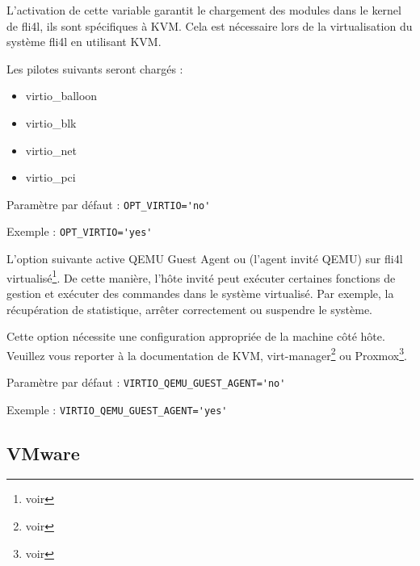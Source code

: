 \begin{description}

L'activation de cette variable garantit le chargement des modules dans
le kernel de fli4l, ils sont spécifiques à KVM. Cela est nécessaire
lors de la virtualisation du système fli4l en utilisant KVM.

Les pilotes suivants seront chargés :

\begin{itemize}
   \item virtio\_balloon
   \item virtio\_blk
   \item virtio\_net
   \item virtio\_pci
\end{itemize}

Paramètre par défaut : \verb+OPT_VIRTIO='no'+

Exemple : \verb+OPT_VIRTIO='yes'+

L'option suivante active QEMU Guest Agent ou (l’agent invité QEMU)
sur fli4l virtualisé\footnote{voir }.
De cette manière, l'hôte invité peut exécuter certaines fonctions
de gestion et exécuter des commandes dans le système virtualisé.
Par exemple, la récupération de statistique, arrêter correctement
ou suspendre le système.

Cette option nécessite une configuration appropriée de la machine
côté hôte. Veuillez vous reporter à la documentation de KVM,
virt-manager\footnote{voir } ou
Proxmox\footnote{voir }.

Paramètre par défaut : \verb+VIRTIO_QEMU_GUEST_AGENT='no'+

Exemple : \verb+VIRTIO_QEMU_GUEST_AGENT='yes'+

\end{description}

\subsection {VMware}

